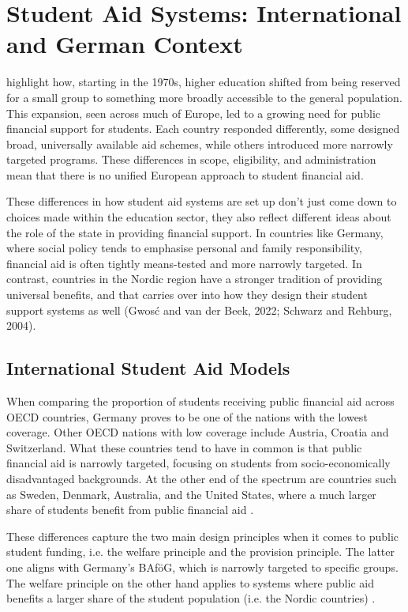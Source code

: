 \section{Student Aid Systems: International and German Context}
\label{section:student-aid-systems}

\cite{schwarz_study_2004} highlight how, starting in the 1970s, higher education shifted from being reserved for a small group to something more broadly accessible to the general population. This expansion, seen across much of Europe, led to a growing need for public financial support for students. Each country responded differently, some designed broad, universally available aid schemes, while others introduced more narrowly targeted programs. These differences in scope, eligibility, and administration mean that there is no unified European approach to student financial aid.

These differences in how student aid systems are set up don’t just come down to choices made within the education sector, they also reflect different ideas about the role of the state in providing financial support. In countries like Germany, where social policy tends to emphasise personal and family responsibility, financial aid is often tightly means-tested and more narrowly targeted. In contrast, countries in the Nordic region have a stronger tradition of providing universal benefits, and that carries over into how they design their student support systems as well (Gwosć and van der Beek, 2022; Schwarz and Rehburg, 2004).


\subsection{International Student Aid Models} \label{subsection:international-sstudent-aid-models} 

When comparing the proportion of students receiving public financial aid across OECD countries, Germany proves to be one of the nations with the lowest coverage. Other OECD nations with low coverage include Austria, Croatia and Switzerland. What these countries tend to have in common is that public financial aid is narrowly targeted, focusing on students from socio-economically disadvantaged backgrounds. At the other end of the spectrum are countries such as Sweden, Denmark, Australia, and the United States, where a much larger share of students benefit from public financial aid \citep{oecd_education_2024}.

These differences capture the two main design principles when it comes to public student funding, i.e. the welfare principle and the provision principle. The latter one aligns with Germany's BAföG, which is narrowly targeted to specific groups. The welfare principle on the other hand applies to systems where public aid benefits a larger share of the student population (i.e. the Nordic countries) \citep{gwosc_krisenbewaltigung_2022}.

